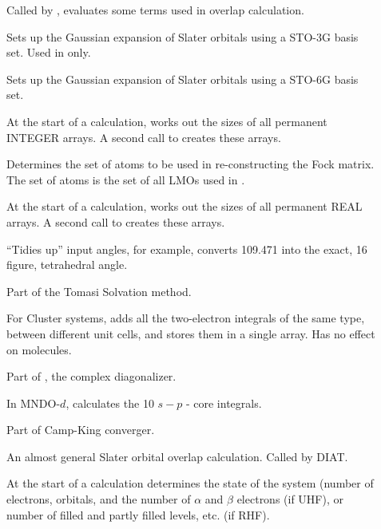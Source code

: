 \begin{description}
\item[] Called by , evaluates some terms used in overlap
calculation.

\item[] Sets up the Gaussian expansion of Slater orbitals using a
STO-3G basis set. Used in  only.

\item[] Sets up the Gaussian expansion of Slater orbitals using a
STO-6G basis set.

\item[] At the start of a calculation,  works out the
sizes of all permanent INTEGER arrays.  A second call to  creates
these arrays.

\item[] Determines the set of atoms to be used in re-constructing
the Fock matrix.  The set of atoms is the set of all LMOs used in .

\item[] At the start of a calculation,  works out the
sizes of all permanent REAL arrays.  A second call to   creates
these arrays. 

\item[] ``Tidies up'' input angles, for example, converts 109.471
into the exact, 16 figure, tetrahedral angle.

\item[] Part of the Tomasi Solvation method.


\item[] For Cluster systems, adds all the two-electron integrals
of the same type, between different unit cells, and stores them in a single
array. Has no effect on molecules.

\item[] Part of , the complex diagonalizer.

\item[] In MNDO-$d$,  calculates the 10 $s-p$ - core
integrals.

\item[] Part of Camp-King converger.

\item[] An almost general Slater orbital overlap calculation. Called
by DIAT.

\item[] At the start of a calculation  determines the
state of the system (number of electrons, orbitals, and the number of $\alpha$
and $\beta$ electrons (if UHF), or number of filled and partly filled levels,
etc. (if RHF).


\end{description}
